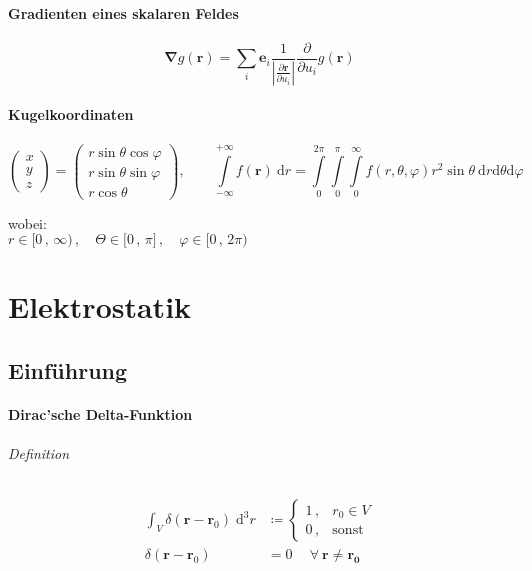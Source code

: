 \documentclass[titlepage,11pt,a4paper,ngerman]{report}
\newcommand{\prt}[2]{\frac{\partial #1}{\partial #2}}
\renewcommand{\vec}[1]{\boldsymbol{#1}}
\newcommand{\vabla}{\boldsymbol{\nabla}}
\renewcommand{\paragraph}[1]{\subsubsection{#1}}
\begin{document}
\paragraph{Gradienten eines skalaren Feldes}
$$\vabla g(\vec{r}) = \sum_i \vec{e}_i \frac{1}{\left|\prt{\vec{r}}{u_i}\right|}\prt{}{u_i}g(\vec{r})$$

\paragraph{Kugelkoordinaten}
$$
\begin{pmatrix}
	x \\ y\\ z
\end{pmatrix}
=
\begin{pmatrix}
	r \sin \theta \cos \varphi\\
	r \sin \theta \sin \varphi\\
	r \cos \theta
\end{pmatrix}
, \qquad \int\limits_{-\infty}^{+\infty} f(\vec{r})\ \textrm{d}r = \int\limits_{0}^{2 \pi} \int\limits_{0}^{\pi} \int\limits_{0}^{\infty} f(r,\theta,\varphi) r^2 \sin \theta\ \textrm{d}r \textrm{d}\theta \textrm{d}\varphi
$$

wobei:\\
$r\in \lbrack0\, ,\,\infty)\, ,\quad \Theta\in\lbrack 0\, ,\, \pi\rbrack\, , \quad \varphi\in\lbrack 0\, ,\, 2\pi) $

\chapter{Elektrostatik}

\section{Einführung}
\paragraph{Dirac'sche Delta-Funktion}
\subparagraph{Definition}

\begin{align*}
\int_{V} \delta(\vec{r}-\vec{r}_0) \; \text{d}^3r &\coloneqq
	\begin{cases} 
		1 \, , & r_0 \in V \\
		0 \, , & \text{sonst}
	\end{cases} \\
\delta(\vec{r}-\vec{r}_0) &= 0 \quad \ \forall \: \vec{r} \neq \vec{r_0}
\end{align*}
\end{document}
